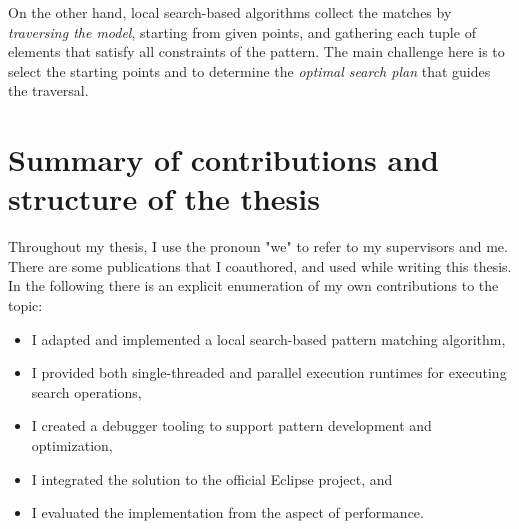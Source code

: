 On the other hand, local search-based algorithms collect the matches by \emph{traversing the model}, starting from given points, and gathering each tuple of elements that satisfy all constraints of the pattern. The main challenge here is to select the starting points and to determine the \emph{optimal search plan} that guides the traversal. 



\section{Summary of contributions and structure of the thesis}


Throughout my thesis, I use the pronoun "we" to refer to my supervisors and me. There are some publications that I coauthored, and used while writing this thesis. In the following there is an explicit enumeration of my own contributions to the topic:

\begin{itemize}
	\item I adapted and implemented a local search-based pattern matching algorithm,
	\item I provided both single-threaded and parallel execution runtimes for executing search operations,
	\item I created a debugger tooling to support pattern development and optimization,
	\item I integrated the solution to the \eiq official Eclipse project, and
	\item I evaluated the implementation from the aspect of performance.
\end{itemize}


